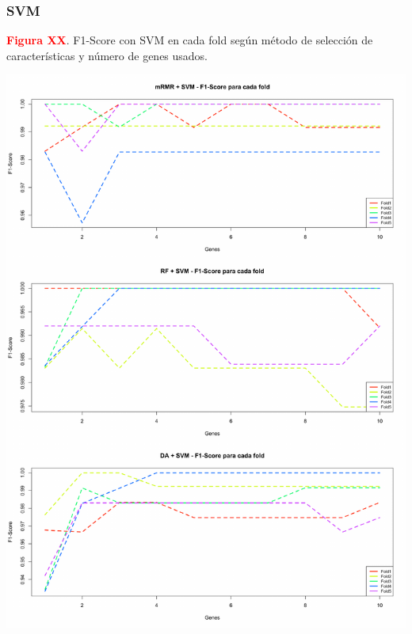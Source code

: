 \newpage
\subsubsection{SVM}

\textbf{\textcolor{red}{Figura XX}}. F1-Score con SVM en cada fold según método de selección de características y número de genes usados.
\begin{center}
	\includegraphics[width=.95\textwidth]{figuras/higado_biclase_folds_f1_svm.pdf} \\
\end{center}

